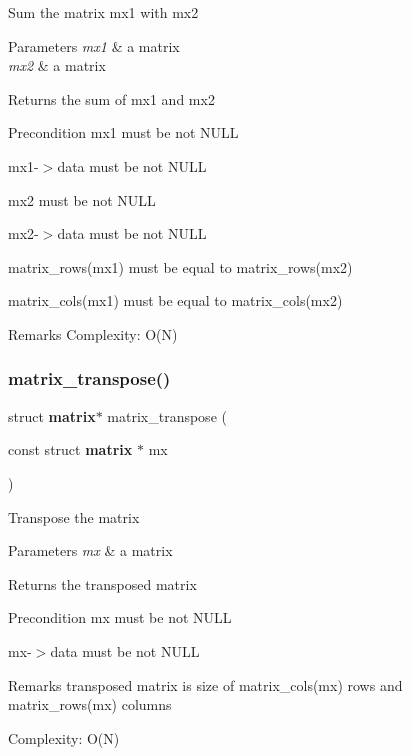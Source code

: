 Sum the matrix {\ttfamily mx1} with {\ttfamily mx2}


\begin{DoxyParams}{Parameters}
{\em mx1} & a matrix \\
\hline
{\em mx2} & a matrix \\
\hline
\end{DoxyParams}
\begin{DoxyReturn}{Returns}
the sum of {\ttfamily mx1} and {\ttfamily mx2}
\end{DoxyReturn}
\begin{DoxyPrecond}{Precondition}
{\ttfamily mx1} must be not N\+U\+LL 

{\ttfamily mx1-\/$>$data} must be not N\+U\+LL 

{\ttfamily mx2} must be not N\+U\+LL 

{\ttfamily mx2-\/$>$data} must be not N\+U\+LL 

{\ttfamily matrix\+\_\+rows(mx1)} must be equal to {\ttfamily matrix\+\_\+rows(mx2)} 

{\ttfamily matrix\+\_\+cols(mx1)} must be equal to {\ttfamily matrix\+\_\+cols(mx2)}
\end{DoxyPrecond}
\begin{DoxyRemark}{Remarks}
Complexity\+: O(\+N) 
\end{DoxyRemark}
\mbox{\label{matrix_8h_af82ecbbd42a059dd5db3d038fd75e9db}} 
\subsubsection{matrix\+\_\+transpose()}
{\footnotesize\ttfamily struct \textbf{ matrix}$\ast$ matrix\+\_\+transpose (\begin{DoxyParamCaption}\item[{const struct \textbf{ matrix} $\ast$}]{mx }\end{DoxyParamCaption})}

Transpose the matrix


\begin{DoxyParams}{Parameters}
{\em mx} & a matrix \\
\hline
\end{DoxyParams}
\begin{DoxyReturn}{Returns}
the transposed matrix
\end{DoxyReturn}
\begin{DoxyPrecond}{Precondition}
{\ttfamily mx} must be not N\+U\+LL 

{\ttfamily mx-\/$>$data} must be not N\+U\+LL
\end{DoxyPrecond}
\begin{DoxyRemark}{Remarks}
transposed matrix is size of {\ttfamily matrix\+\_\+cols(mx)} rows and {\ttfamily matrix\+\_\+rows(mx)} columns 

Complexity\+: O(\+N) 
\end{DoxyRemark}
